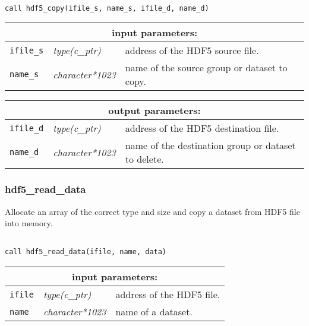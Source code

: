 \begin{verbatim}

call hdf5_copy(ifile_s, name_s, ifile_d, name_d)
\end{verbatim}

\noindent
\begin{tabular}{|p{1.5cm}|p{3cm}|p{10cm}|}
\hline
\multicolumn{3}{|c|}{\bf input parameters:} \\
\hline
{\tt ifile\_s} & {\it type(c\_ptr)} & address of the HDF5 source file. \\
\hline
{\tt name\_s} & {\it character*1023} & name of the source group or dataset to copy. \\
\hline
\end{tabular}

\vskip 0.8cm

\noindent
\begin{tabular}{|p{1.5cm}|p{3cm}|p{10cm}|}
\hline
\multicolumn{3}{|c|}{\bf output parameters:} \\
\hline
{\tt ifile\_d} & {\it type(c\_ptr)} & address of the HDF5 destination file. \\
\hline
{\tt name\_d} & {\it character*1023} & name of the destination group or dataset to delete. \\
\hline
\end{tabular}

\vskip 0.8cm

\subsubsection{hdf5\_read\_data}

Allocate an array of the correct type and size and copy a dataset from HDF5 file into memory.

\begin{verbatim}

call hdf5_read_data(ifile, name, data)
\end{verbatim}

\noindent
\begin{tabular}{|p{1.5cm}|p{3cm}|p{10cm}|}
\hline
\multicolumn{3}{|c|}{\bf input parameters:} \\
\hline
{\tt ifile} & {\it type(c\_ptr)} & address of the HDF5 file. \\
\hline
{\tt name} & {\it character*1023} & name of a dataset. \\
\hline
\end{tabular}

\vskip 0.8cm

